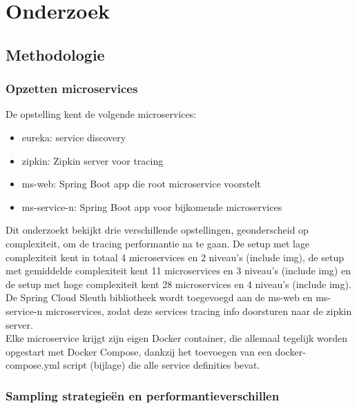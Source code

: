 
\chapter{Onderzoek}
\label{ch:onderzoek}

\section{Methodologie}
\label{sec:methodologie}

\subsection{Opzetten microservices}
\label{sec:opzetten}

De opstelling kent de volgende microservices:
\begin{itemize}
\item eureka: service discovery
\item zipkin: Zipkin server voor tracing
\item ms-web: Spring Boot app die root microservice voorstelt
\item ms-service-n: Spring Boot app voor bijkomende microservices 
\end{itemize}

Dit onderzoekt bekijkt drie verschillende opstellingen, geonderscheid op complexiteit, om de tracing performantie na te gaan. De setup met lage complexiteit kent in totaal 4 microservices en 2 niveau's (include img), de setup met gemiddelde complexiteit kent 11 microservices en 3 niveau's (include img) en de setup met hoge complexiteit kent 28 microservices en 4 niveau's (include img). \\

De Spring Cloud Sleuth bibliotheek wordt toegevoegd aan de ms-web en ms-service-n microservices, zodat deze services tracing info doorsturen naar de zipkin server. \\

Elke microservice krijgt zijn eigen Docker container, die allemaal tegelijk worden opgestart met Docker Compose, dankzij het toevoegen van een docker-compose.yml script (bijlage) die alle service definities bevat. \\

\subsection{Sampling strategieën en performantieverschillen}
\label{sec:sampling}

